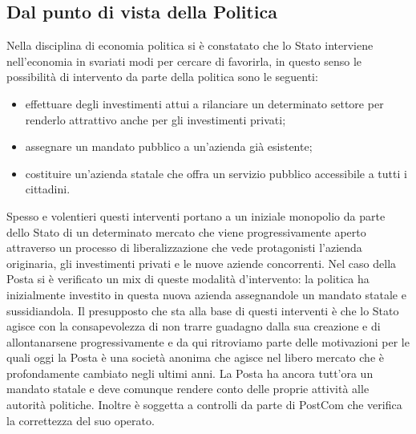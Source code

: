 \subsection{Dal punto di vista della Politica}
Nella disciplina di economia politica si è constatato che lo Stato interviene nell’economia in svariati modi per cercare di favorirla, in questo senso le possibilità di intervento da parte della politica sono le seguenti:
\begin{itemize}
    \item effettuare degli investimenti attui a rilanciare un determinato settore per renderlo attrattivo anche per gli investimenti privati;
    \item assegnare un mandato pubblico a un’azienda già esistente;
    \item costituire un’azienda statale che offra un servizio pubblico accessibile a tutti i cittadini.
    
\end{itemize}
Spesso e volentieri questi interventi portano a un iniziale monopolio da parte dello Stato di un determinato mercato che viene progressivamente aperto attraverso un processo di liberalizzazione che vede protagonisti l’azienda originaria, gli investimenti privati e le nuove aziende concorrenti.
Nel caso della Posta si è verificato un mix di queste modalità d’intervento: la politica ha inizialmente investito in questa nuova azienda assegnandole un mandato statale e sussidiandola. Il presupposto che sta alla base di questi interventi è che lo Stato agisce con la consapevolezza di non trarre guadagno dalla sua creazione e di allontanarsene progressivamente e da qui ritroviamo parte delle motivazioni per le quali oggi la Posta è una società anonima che agisce nel libero mercato che è profondamente cambiato negli ultimi anni.
La Posta ha ancora tutt’ora un mandato statale e deve comunque rendere conto delle proprie attività alle autorità politiche. Inoltre è soggetta a controlli da parte di PostCom che verifica la correttezza del suo operato.
